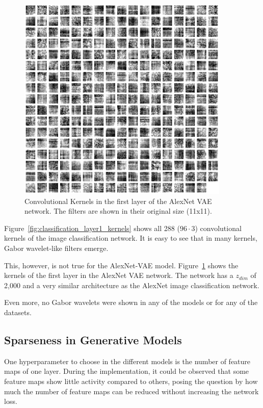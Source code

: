 \begin{figure}
    \centering
    \includegraphics[width=0.9\textwidth]{images/alexnet_vae_l1_kernels.png}
    \caption[\ac{VAE} - Layer 1 Kernels]{Convolutional Kernels in the first layer of the AlexNet \ac{VAE} network. The filters are shown in their original size (11x11).}
    \label{fig:vae_layer1_kernels}
\end{figure}

Figure~\ref{fig:classification_layer1_kernels} shows all 288 ($96 \cdot 3$) convolutional kernels of the image classification network.
It is easy to see that in many kernels, Gabor wavelet-like filters emerge.

This, however, is not true for the AlexNet-\ac{VAE} model.
Figure~\ref{fig:vae_layer1_kernels} shows the kernels of the first layer in the AlexNet \ac{VAE} network.
The network has a $z_{dim}$ of 2,000 and a very similar architecture as the AlexNet image classification network.

Even more, no Gabor wavelets were shown in any of the models or for any of the datasets.


\subsection{Sparseness in Generative Models}\label{subsec:effective-network-capacity}
One hyperparameter to choose in the different models is the number of feature maps of one layer.
During the implementation, it could be observed that some feature maps show little activity compared to others, posing the question by how much the number of feature maps can be reduced without increasing the network loss.

